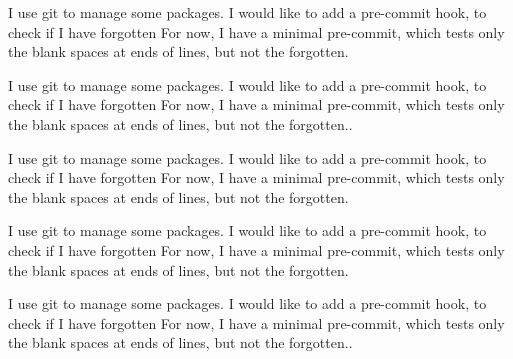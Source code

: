 \documentclass{book}
\begin{document}
\begin{pairs}
\begin{Rightside}
\pstart
{}
\pend

\pstart
I use git to manage some packages.
I would like to add a pre-commit hook, to check if I have forgotten
For now, I have a minimal pre-commit, which tests only the blank spaces at ends of lines, but not the forgotten.
\pend


\endnumbering

\end{Rightside}

\end{pairs}
\Columns

\beforeeledchapter


\begin{pairs}
\begin{Leftside}
\beginnumbering

\pstart
{}
\pend

\pstart
I use git to manage some packages.
I would like to add a pre-commit hook, to check if I have forgotten
For now, I have a minimal pre-commit, which tests only the blank spaces at ends of lines, but not the forgotten..
\pend

\pstart
{}
\pend

\pstart
{}
\pend

\pstart
{}
\pend

\pstart
I use git to manage some packages.
I would like to add a pre-commit hook, to check if I have forgotten
For now, I have a minimal pre-commit, which tests only the blank spaces at ends of lines, but not the forgotten.
\pend

\pstart
{}
\pend

\pstart
I use git to manage some packages.
I would like to add a pre-commit hook, to check if I have forgotten
For now, I have a minimal pre-commit, which tests only the blank spaces at ends of lines, but not the forgotten.
\pend

\endnumbering
\end{Leftside}

\begin{Rightside}

\beginnumbering

\pstart
{}
\pend

\pstart
I use git to manage some packages.
I would like to add a pre-commit hook, to check if I have forgotten
For now, I have a minimal pre-commit, which tests only the blank spaces at ends of lines, but not the forgotten..
\pend


\end{Rightside}
\end{pairs}
\end{document}
